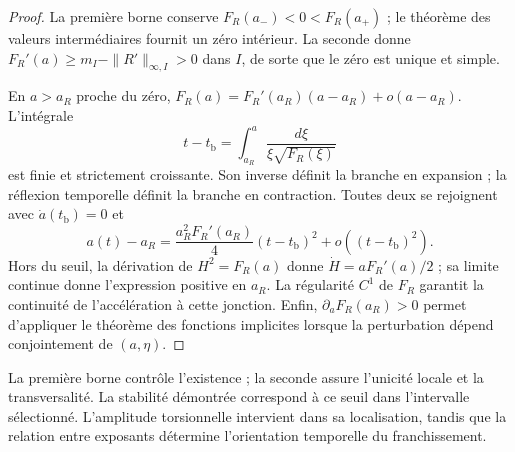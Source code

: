 \begin{proof}
La première borne conserve \(F_R(a_-)<0<F_R(a_+)\) ; le théorème des valeurs intermédiaires fournit un zéro intérieur. La seconde donne \(F_R'(a)\geq m_I-\|R'\|_{\infty,I}>0\) dans \(I\), de sorte que le zéro est unique et simple.

En \(a>a_R\) proche du zéro,
\(F_R(a)=F_R'(a_R)(a-a_R)+o(a-a_R)\).
L'intégrale
\[
 t-t_{\mathrm b}=\int_{a_R}^{a}
          \frac{d\xi}{\xi\sqrt{F_R(\xi)}}
\]
est finie et strictement croissante. Son inverse définit la branche
en expansion ; la réflexion temporelle définit la branche en contraction.
Toutes deux se rejoignent avec \(\dot a(t_{\mathrm b})=0\) et
\[
 a(t)-a_R
 =\frac{a_R^2F_R'(a_R)}4(t-t_{\mathrm b})^2
   +o((t-t_{\mathrm b})^2).
\]
Hors du seuil, la dérivation de \(H^2=F_R(a)\) donne
\(\dot H=aF_R'(a)/2\) ; sa limite continue donne l'expression positive
en \(a_R\). La régularité \(C^1\) de \(F_R\) garantit la continuité
de l'accélération à cette jonction. Enfin,
\(\partial_aF_R(a_R)>0\) permet d'appliquer le théorème des fonctions
implicites lorsque la perturbation dépend conjointement de \((a,\eta)\).
\end{proof}

La première borne contrôle l'existence ; la seconde assure l'unicité locale et la transversalité. La stabilité démontrée correspond à ce seuil dans l'intervalle sélectionné. L'amplitude torsionnelle intervient dans sa localisation, tandis que la relation entre exposants détermine l'orientation temporelle du franchissement.

\par\endgroup
